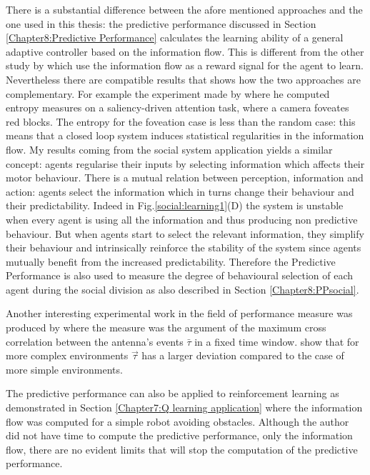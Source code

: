 There is a substantial difference between the afore mentioned approaches and the
one used in this thesis:
the predictive performance discussed in Section \ref{Chapter8:Predictive Performance}
calculates the learning ability of a general adaptive controller
 based on the information flow.
This is different from the other study by \citet{organizationInfo,LungarellaInformationStructure,Ay2008:PredInformation} 
which use the information flow as a reward signal for the agent to learn.
Nevertheless there are compatible results that shows how the
two approaches are complementary.
For example the experiment made by \citet{LungarellaInformationStructure}
where he computed entropy measures on a saliency-driven attention
task, where a camera foveates red blocks. The entropy for the
foveation case is less than the random case:
this means that a closed loop system induces statistical regularities
in the information flow.
My results coming from the social system application yields
a similar concept: agents regularise their inputs
by selecting information which affects their motor behaviour.
There is a mutual relation between perception, information and action:
agents select the information which in turns change their
behaviour and their predictability.
Indeed in Fig.\ref{social:learning1}(D) the system is unstable
when every agent is using all the information and thus producing
non predictive behaviour. But when agents start to select the
relevant information, they simplify their behaviour and intrinsically reinforce
the stability of the system since agents mutually benefit from the increased predictability.
Therefore the Predictive Performance is also used to measure the degree of behavioural
selection of each agent during the social division as also described in Section \ref{Chapter8:PPsocial}.

Another interesting experimental work in the field of performance measure was produced 
by \citet{Kulvicius2009:analysisdifferential} where the measure was the argument of the maximum 
cross correlation between the antenna's events $\bar{\tau}$ in a fixed time window.
\citet{Kulvicius2009:analysisdifferential} show that for more complex environments $\vec{\tau}$ has a larger
deviation compared to the case of more simple environments.

The predictive performance can also be applied to reinforcement learning \citep{TD}
as demonstrated in Section \ref{Chapter7:Q learning application} where
the information flow was computed for a simple robot avoiding obstacles.
Although the author did not have time to compute the predictive performance, 
only the information flow, there are no evident limits that will stop
the computation of the predictive performance.


